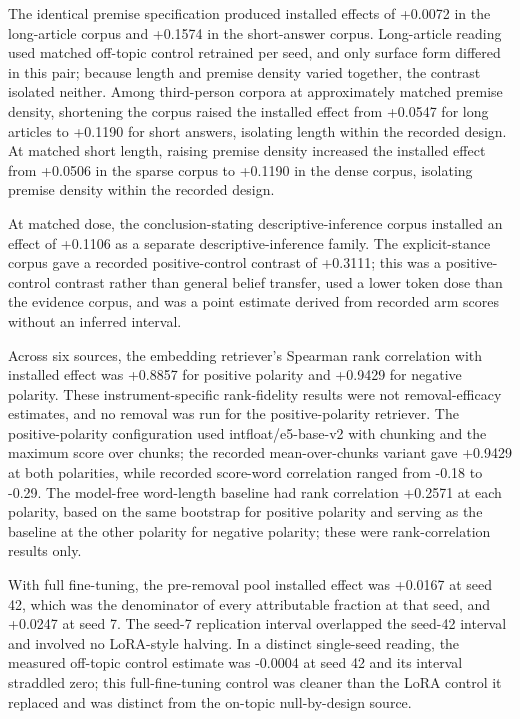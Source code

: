 \documentclass[10pt]{article}
\begin{document}
The identical premise specification produced installed effects of +0.0072 in the long-article corpus and +0.1574 in the short-answer corpus. Long-article reading used matched off-topic control retrained per seed, and only surface form differed in this pair; because length and premise density varied together, the contrast isolated neither. Among third-person corpora at approximately matched premise density, shortening the corpus raised the installed effect from +0.0547 for long articles to +0.1190 for short answers, isolating length within the recorded design. At matched short length, raising premise density increased the installed effect from +0.0506 in the sparse corpus to +0.1190 in the dense corpus, isolating premise density within the recorded design.



At matched dose, the conclusion-stating descriptive-inference corpus installed an effect of +0.1106 as a separate descriptive-inference family. The explicit-stance corpus gave a recorded positive-control contrast of +0.3111; this was a positive-control contrast rather than general belief transfer, used a lower token dose than the evidence corpus, and was a point estimate derived from recorded arm scores without an inferred interval.



Across six sources, the embedding retriever’s Spearman rank correlation with installed effect was +0.8857 for positive polarity and +0.9429 for negative polarity. These instrument-specific rank-fidelity results were not removal-efficacy estimates, and no removal was run for the positive-polarity retriever. The positive-polarity configuration used intfloat/e5-base-v2 with chunking and the maximum score over chunks; the recorded mean-over-chunks variant gave +0.9429 at both polarities, while recorded score-word correlation ranged from -0.18 to -0.29. The model-free word-length baseline had rank correlation +0.2571 at each polarity, based on the same bootstrap for positive polarity and serving as the baseline at the other polarity for negative polarity; these were rank-correlation results only.



With full fine-tuning, the pre-removal pool installed effect was +0.0167 at seed 42, which was the denominator of every attributable fraction at that seed, and +0.0247 at seed 7. The seed-7 replication interval overlapped the seed-42 interval and involved no LoRA-style halving. In a distinct single-seed reading, the measured off-topic control estimate was -0.0004 at seed 42 and its interval straddled zero; this full-fine-tuning control was cleaner than the LoRA control it replaced and was distinct from the on-topic null-by-design source.
\end{document}
